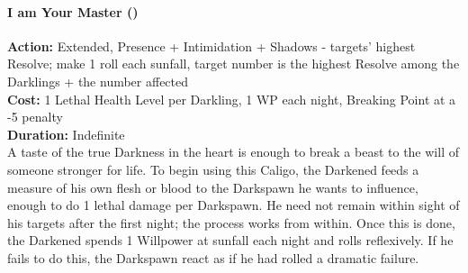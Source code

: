 \paragraph*{I am Your Master (\textbullet\textbullet\textbullet\textbullet\textbullet)}

\noindent \textbf{Action:} Extended, Presence + Intimidation + Shadows - targets' highest Resolve; make 1 roll each sunfall, target number is the highest Resolve among the Darklings + the number affected\\

\noindent \textbf{Cost:} 1 Lethal Health Level per Darkling, 1 WP each night, Breaking Point at a -5 penalty\\

\noindent \textbf{Duration:} Indefinite \\

\noindent A taste of the true Darkness in the heart is enough to break a beast to the will of someone stronger for life. To begin using this Caligo, the Darkened feeds a measure of his own flesh or blood to the Darkspawn he wants to influence, enough to do 1 lethal damage per Darkspawn. He need not remain within sight of his targets after the first night; the process works from within. Once this is done, the Darkened spends 1 Willpower at sunfall each night and rolls reflexively. If he fails to do this, the Darkspawn react as if he had rolled a dramatic failure.

